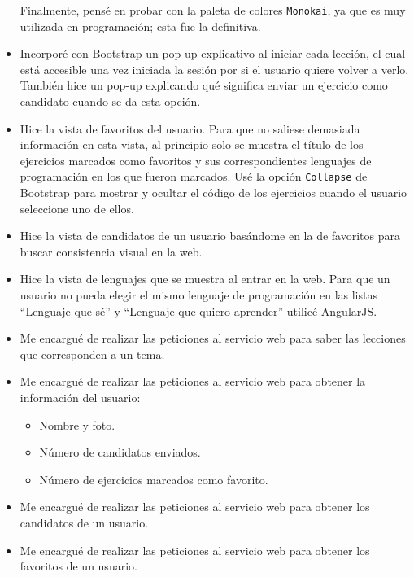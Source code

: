\begin{itemize}
Finalmente, pensé en probar con la paleta de colores \texttt{Monokai}, ya que es muy utilizada en programación; esta fue la definitiva.

\item
Incorporé con Bootstrap un pop-up explicativo al iniciar cada lección, el cual está accesible una vez iniciada la sesión por si el usuario quiere volver a verlo. También hice un pop-up explicando qué significa enviar un ejercicio como candidato cuando se da esta opción.

\item
Hice la vista de favoritos del usuario. Para que no saliese demasiada información en esta vista, al principio solo se muestra el título de los ejercicios marcados como favoritos y sus correspondientes lenguajes de programación en los que fueron marcados. Usé la opción \texttt{Collapse} de Bootstrap para mostrar y ocultar el código de los ejercicios cuando el usuario seleccione uno de ellos.

\item
Hice la vista de candidatos de un usuario basándome en la de favoritos para buscar consistencia visual en la web.

\item
Hice la vista de lenguajes que se muestra al entrar en la web. Para que un usuario no pueda elegir el mismo lenguaje de programación en las listas ``Lenguaje que sé'' y ``Lenguaje que quiero aprender'' utilicé AngularJS.

\item
Me encargué de realizar las peticiones al servicio web para saber las lecciones que corresponden a un tema.

\item
Me encargué de realizar las peticiones al servicio web para obtener la información del usuario:

\begin{itemize}
\item
Nombre y foto.
\item
Número de candidatos enviados.
\item
Número de ejercicios marcados como favorito.
\end{itemize}

\item
Me encargué de realizar las peticiones al servicio web para obtener los candidatos de un usuario.

\item
Me encargué de realizar las peticiones al servicio web para obtener los favoritos de un usuario.


\end{itemize}
